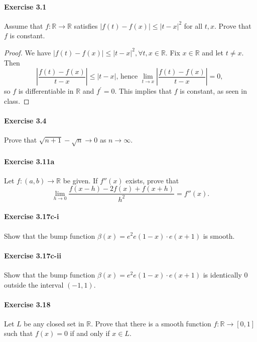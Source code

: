 \documentclass{article}
\begin{document}
\paragraph{Exercise 3.1} Assume that $f \colon \mathbb{R} \rightarrow \mathbb{R}$ satisfies $|f(t)-f(x)| \leq|t-x|^{2}$ for all $t, x$. Prove that $f$ is constant.
\begin{proof}
    We have $|f(t)-f(x)| \leq|t-x|^2, \forall t, x \in \mathbb{R}$. Fix $x \in \mathbb{R}$ and let $t \neq x$. Then
$$
\left|\frac{f(t)-f(x)}{t-x}\right| \leq|t-x| \text {, hence } \lim _{t \rightarrow x}\left|\frac{f(t)-f(x)}{t-x}\right|=0 \text {, }
$$
so $f$ is differentiable in $\mathbb{R}$ and $f^{\prime}=0$. This implies that $f$ is constant, as seen in class.
\end{proof}



\paragraph{Exercise 3.4} Prove that $\sqrt{n+1}-\sqrt{n} \rightarrow 0$ as $n \rightarrow \infty$.


\paragraph{Exercise 3.11a} Let $f \colon (a, b) \rightarrow \mathbb{R}$ be given.  If $f''(x)$ exists, prove that \[\lim_{h \rightarrow 0} \frac{f(x - h) - 2f(x) + f(x + h)}{h^2} = f''(x).\]


\paragraph{Exercise 3.17c-i} Show that the bump function $\beta(x)=e^{2} e(1-x) \cdot e(x+1)$ is smooth.


\paragraph{Exercise 3.17c-ii} Show that the bump function $\beta(x)=e^{2} e(1-x) \cdot e(x+1)$ is identically 0 outside the interval $(-1, 1)$.


\paragraph{Exercise 3.18} Let $L$ be any closed set in $\mathbb{R}$. Prove that there is a smooth function $f \colon \mathbb{R} \rightarrow [0, 1]$ such that $f(x) = 0$ if and only if $x \in L$.
\end{document}
